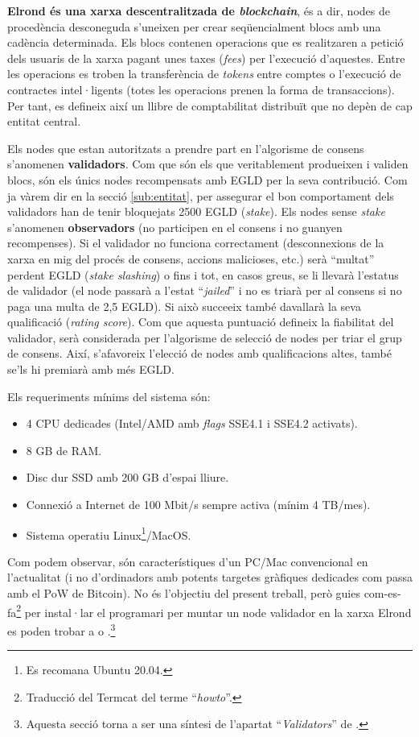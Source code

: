 \documentclass[11pt,a4paper]{article}
\begin{document}
\textbf{Elrond és una xarxa descentralitzada de \textit{blockchain}}, és a dir, nodes de procedència desconeguda s'uneixen per crear seqüencialment blocs amb una cadència determinada. Els blocs contenen operacions que es realitzaren a petició dels usuaris de la xarxa pagant unes taxes (\textit{fees}) per l'execució d'aquestes. Entre les operacions es troben la transferència de \textit{tokens} entre comptes o l'execució de contractes intel·ligents (totes les operacions prenen la forma de transaccions). Per tant, es defineix així un llibre de comptabilitat distribuït que no depèn de cap entitat central. 

Els nodes que estan autoritzats a prendre part en l'algorisme de consens s'anomenen \textbf{validadors}. Com que són els que veritablement produeixen i validen blocs, són els únics nodes recompensats amb EGLD per la seva contribució. Com ja vàrem dir en la secció \ref{sub:entitat}, per assegurar el bon comportament dels validadors han de tenir bloquejats 2500 EGLD (\textit{stake}). Els nodes sense \textit{stake} s'anomenen \textbf{observadors} (no participen en el consens i no guanyen recompenses). Si el validador no funciona correctament (desconnexions de la xarxa en mig del procés de consens, accions malicioses, etc.) serà ``multat'' perdent EGLD (\textit{stake slashing}) o fins i tot, en casos greus, se li llevarà l'estatus de validador (el node passarà a l'estat ``\textit{jailed}'' i no es triarà per al consens si no paga una multa de 2,5 EGLD).  Si això succeeix també davallarà la seva qualificació (\textit{rating score}). Com que aquesta puntuació defineix la fiabilitat del validador, serà considerada per l'algorisme de selecció de nodes per triar el grup de consens. Així, s'afavoreix l'elecció de nodes amb qualificacions altes, també se'ls hi premiarà amb més EGLD. 

Els requeriments mínims del sistema són:
\begin{itemize}
\item 4 CPU dedicades (Intel/AMD amb \textit{flags} SSE4.1 i SSE4.2 activats).
\item 8 GB de RAM.
\item Disc dur SSD amb 200 GB d'espai lliure.
\item Connexió a Internet de 100 Mbit/s sempre activa (mínim 4 TB/mes).
\item Sistema operatiu Linux\footnote{Es recomana Ubuntu 20.04.}/MacOS.
\end{itemize}

Com podem observar, són característiques d'un PC/Mac convencional en l'actualitat (i no d'ordinadors amb potents targetes gràfiques dedicades com passa amb el PoW de Bitcoin). No és l'objectiu del present treball, però guies com-es-fa\footnote{Traducció del Termcat del terme ``\textit{howto}''.} per instal·lar el programari per muntar un node validador en la xarxa Elrond es poden trobar a \cite{elrond2022} o \cite{penalver2019}.\footnote{Aquesta secció torna a ser una síntesi de l'apartat ``\textit{Validators}'' de \cite{elrond2022}.}
\end{document}
